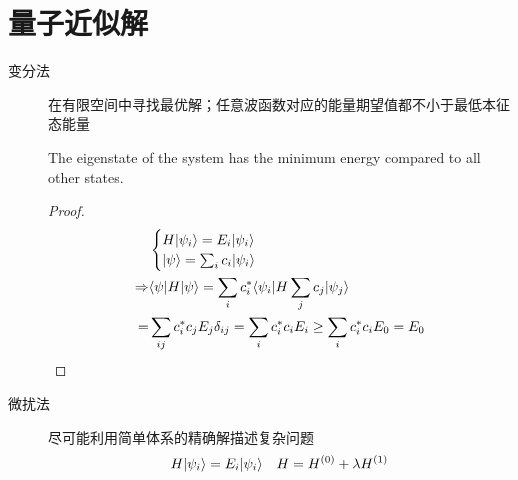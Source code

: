 \section{量子近似解}

\begin{description}
	\item[变分法] 在有限空间中寻找最优解；任意波函数对应的能量期望值都不小于最低本征态能量

	\begin{theorem}
	The eigenstate of the system has the minimum energy compared to all other states.
	\end{theorem}

	\begin{proof}
	\begin{align}
	&\begin{cases}
	H| \psi_i \rangle = E_i| \psi_i \rangle\\
	| \psi \rangle=\sum_i c_i | \psi_i \rangle
	\end{cases}\\
	\Rightarrow & \langle \psi | H | \psi \rangle = \sum_i c_i^* \langle \psi_i | H \sum_j c_j | \psi_j \rangle \\
	=& \sum_{ij}c_i^*c_j E_j \delta_{ij}=\sum_i c_i^* c_i E_i \geq \sum_i c_i^* c_i E_{0}=E_{0}
	\end{align}
	\end{proof}

	\item[微扰法] 尽可能利用简单体系的精确解描述复杂问题
	\begin{equation}
	H| \psi_i \rangle=E_i| \psi_i \rangle \quad H=H^{(0)} +\lambda H^{(1)}
	\end{equation}


\end{description}
